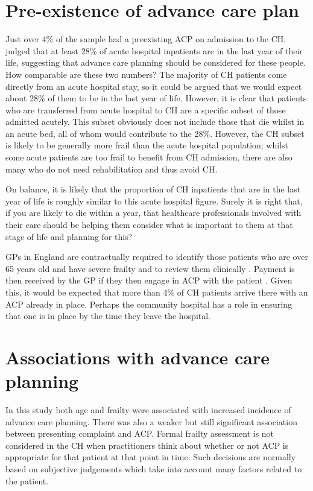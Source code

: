 \documentclass
[
	12pt,
	a4paper,
	oneside,
]{report}
\begin{document}
\section{Pre-existence of advance care plan}

Just over 4\% of the sample had a preexisting ACP on admission to the CH. 
\textcite{clarke:14} judged that at least 28\% of acute hospital 
inpatients are in the last year of their life, suggesting that advance care 
planning should be considered for these people. How comparable are these two
numbers? The majority of CH patients come directly from an acute hospital
stay, so it could be argued that we would expect about 28\% of them to be in
the last year of life. However, it is clear that patients who are transferred 
from acute hospital to CH are a specific subset of those admitted acutely.
This subset obviously does not include those that die whilst in an acute bed,
all of whom would contribute to the 28\%.  However, the CH subset is likely 
to be generally more frail than the acute hospital population; whilst some
acute patients are too frail to benefit from CH admission, there are also many 
who do not need rehabilitation and thus avoid CH.

On balance, it is likely that the proportion of CH inpatients that are in the
last year of life is roughly similar to this acute hospital figure. Surely it
is right that, if you are likely to die within a year, that healthcare
professionals involved with their care should be helping them consider what
is important to them at that stage of life and planning for this? 


GPs in England are contractually required to identify those patients who are 
over 65 years old and have severe frailty and to review them clinically
\parencite{nhse:17}. Payment is then received by the GP if they then
engage in ACP with the patient \parencite{hunt:16}. Given
this, it would be expected that more than 4\% of CH patients arrive there
with an ACP already in place. Perhaps the community hospital has a role in
ensuring that one is in place by the time they leave the hospital.

\section{Associations with advance care planning}

In this study both age and frailty were associated with increased incidence of
advance care planning. There was also a weaker but still significant association
between presenting complaint and ACP. Formal frailty assessment is not 
considered in the CH when practitioners think about whether or not ACP is 
appropriate for that patient at that point in time. Such decisions are normally
based on subjective judgements which take into account many factors related to
the patient.
\end{document}
